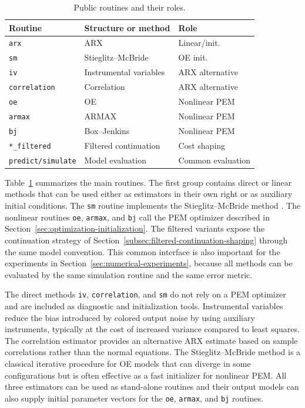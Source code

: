 \documentclass{ifacconf}
\begin{document}
\begin{table}[t]
  \caption{Public routines and their roles.}
  \label{tab:public-routines}
  \centering
  \scriptsize
  \begin{tabular}{lll}
    \toprule
    Routine & Structure or method & Role \\
    \midrule
    \texttt{arx} & ARX & Linear/init. \\
    \texttt{sm} & Stieglitz--McBride & OE init. \\
    \texttt{iv} & Instrumental variables & ARX alternative \\
    \texttt{correlation} & Correlation & ARX alternative \\
    \texttt{oe} & OE & Nonlinear PEM \\
    \texttt{armax} & ARMAX & Nonlinear PEM \\
    \texttt{bj} & Box--Jenkins & Nonlinear PEM \\
    \texttt{*\_filtered} & Filtered continuation & Cost shaping \\
    \texttt{predict/simulate} & Model evaluation & Common evaluation \\
    \bottomrule
  \end{tabular}
\end{table}

Table~\ref{tab:public-routines} summarizes the main routines.  The first group
contains direct or linear methods that can be used either as estimators in their
own right or as auxiliary initial conditions.  The \texttt{sm} routine implements
the Stieglitz--McBride method \citep{stieglitz1965}.  The nonlinear routines
\texttt{oe}, \texttt{armax}, and \texttt{bj} call the PEM optimizer described in
Section~\ref{sec:optimization-initialization}.  The filtered variants expose the
continuation strategy of Section~\ref{subsec:filtered-continuation-shaping}
through the same model convention.  This common interface is also important for
the experiments in Section~\ref{sec:numerical-experiments}, because all methods
can be evaluated by the same simulation routine and the same error metric.

The direct methods \texttt{iv}, \texttt{correlation}, and \texttt{sm} do not
rely on a PEM optimizer and are included as diagnostic and initialization tools.
Instrumental variables reduce the bias introduced by colored output noise by
using auxiliary instruments, typically at the cost of increased variance compared
to least squares.  The correlation estimator provides an alternative ARX estimate
based on sample correlations rather than the normal equations.  The
Stieglitz--McBride method \citep{stieglitz1965} is a classical iterative
procedure for OE models that can diverge in some configurations but is often
effective as a fast initializer for nonlinear PEM.  All three estimators can be
used as stand-alone routines and their output models can also supply initial
parameter vectors for the \texttt{oe}, \texttt{armax}, and \texttt{bj} routines.
\end{document}
